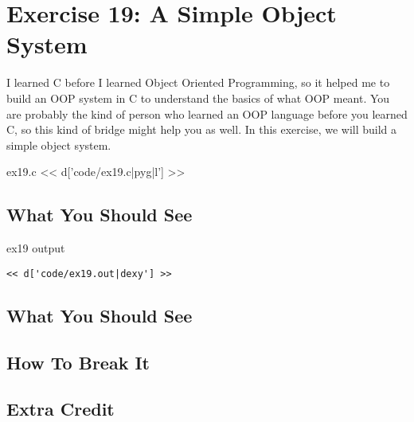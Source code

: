 \chapter{Exercise 19: A Simple Object System}

I learned C before I learned Object Oriented Programming, so 
it helped me to build an OOP system in C to understand the
basics of what OOP meant.  You are probably the kind of person
who learned an OOP language before you learned C, so this kind
of bridge might help you as well.  In this exercise, we will
build a simple object system.


\begin{code}{ex19.c}
<< d['code/ex19.c|pyg|l'] >>
\end{code}

\section{What You Should See}

\begin{code}{ex19 output}
\begin{lstlisting}
<< d['code/ex19.out|dexy'] >>
\end{lstlisting}
\end{code}


\section{What You Should See}


\section{How To Break It}


\section{Extra Credit}



